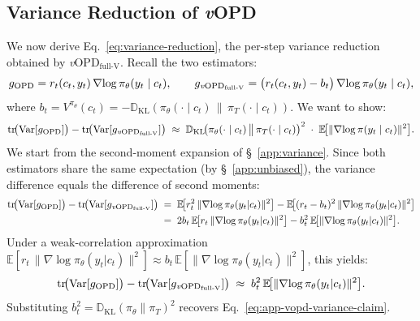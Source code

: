 \documentclass{article}
\newcommand{\method}{\emph{v}OPD}
\begin{document}
\subsection{Variance Reduction of \method{}}
\label{app:variance-derivation}
We now derive Eq.~\eqref{eq:variance-reduction}, the per-step variance reduction
obtained by \method$_\text{full-V}$. Recall the two estimators:
\begin{equation}
g_\text{OPD} =r_t(c_t, y_t)\,\nabla\!\log\pi_\theta(y_t\mid c_t),
\qquad
g_{\text{\method}_{\text{full-V}}} = \bigl(r_t(c_t, y_t) - b_t\bigr)\,\nabla\!\log\pi_\theta(y_t\mid c_t),
\end{equation}
where $b_t = V^{\pi_\theta}(c_t) = -\mathbb{D}_\mathrm{KL}(\pi_\theta(\cdot\mid c_t)\,\|\,\pi_T(\cdot\mid c_t))$. We want to show:
\begin{equation}
\label{eq:app-vopd-variance-claim}
\mathrm{tr}\!\bigl(\mathrm{Var}[g_\text{OPD}]\bigr) - \mathrm{tr}\!\bigl(\mathrm{Var}[g_{\text{\textnormal{\method}}_{\text{full-V}}}]\bigr)
\;\approx\;
\mathbb{D}_\mathrm{KL}\!\bigl(\pi_\theta(\cdot\mid c_t)\,\big\|\,\pi_T(\cdot\mid c_t)\bigr)^{2}
\;\cdot\;
\mathbb{E}\!\bigl[\|\nabla\!\log\pi(y_t\mid c_t)\|^2\bigr].
\end{equation}
We start from the second-moment expansion of \S~\ref{app:variance}. Since both
estimators share the same expectation (by \S~\ref{app:unbiased}), the variance
difference equals the difference of second moments:
\begin{align*}
\mathrm{tr}\!\bigl(\mathrm{Var}[g_\text{OPD}]\bigr) - \mathrm{tr}\!\bigl(\mathrm{Var}[g_{\text{\method}_{\text{full-V}}}]\bigr)
&\;=\; \mathbb{E}\!\bigl[r_t^2\,\|\nabla\!\log\pi_\theta(y_t|c_t)\|^2\bigr]
- \mathbb{E}\!\bigl[(r_t - b_t)^2\,\|\nabla\!\log\pi_\theta(y_t|c_t)\|^2\bigr] \\
&\;=\; 2b_t\,\mathbb{E}\!\bigl[r_t\,\|\nabla\!\log\pi_\theta(y_t|c_t)\|^2\bigr]
- b_t^2\,\mathbb{E}\!\bigl[\|\nabla\!\log\pi_\theta(y_t|c_t)\|^2\bigr].
\end{align*}
Under a weak-correlation approximation $\mathbb{E}[r_t\,\|\nabla\!\log\pi_\theta(y_t|c_t)\|^2] \approx b_t\,\mathbb{E}[\|\nabla\!\log\pi_\theta(y_t|c_t)\|^2]$, this yields:
\begin{equation}
\mathrm{tr}\!\bigl(\mathrm{Var}[g_\text{OPD}]\bigr) - \mathrm{tr}\!\bigl(\mathrm{Var}[g_{\text{\method}_{\text{full-V}}}]\bigr)
\;\approx\;
b_t^2\,\mathbb{E}\!\bigl[\|\nabla\!\log\pi_\theta(y_t|c_t)\|^2\bigr].
\end{equation}
Substituting $b_t^2 = \mathbb{D}_\mathrm{KL}(\pi_\theta\|\pi_T)^2$ recovers Eq.~\eqref{eq:app-vopd-variance-claim}.
\end{document}
